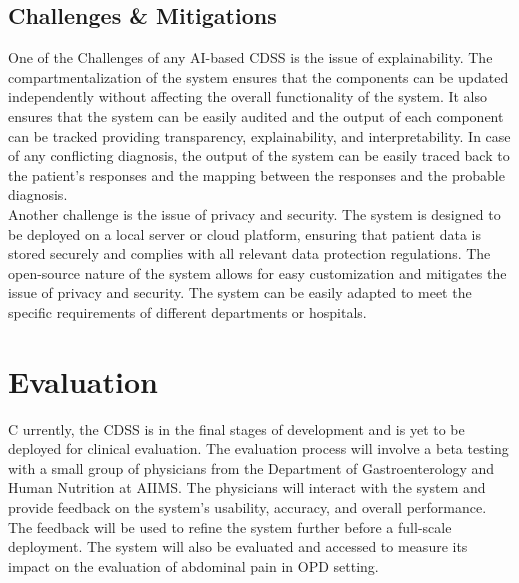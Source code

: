 \subsection{Challenges \& Mitigations}
One of the Challenges of any AI-based CDSS is the issue of explainability. The compartmentalization of the system ensures that the components can be updated independently without affecting the overall functionality of the system. It also ensures that the system can be easily audited and the output of each component can be tracked providing transparency, explainability, and interpretability. In case of any conflicting diagnosis, the output of the system can be easily traced back to the patient's responses and the mapping between the responses and the probable diagnosis.\\[\baselineskip]

\noindent Another challenge is the issue of privacy and security. The system is designed to be deployed on a local server or cloud platform, ensuring that patient data is stored securely and complies with all relevant data protection regulations. The open-source nature of the system allows for easy customization and mitigates the issue of privacy and security. The system can be easily adapted to meet the specific requirements of different departments or hospitals.\\[\baselineskip]

\section{Evaluation}
\lettrine{C}{ }urrently, the CDSS is in the final stages of development and is yet to be deployed for clinical evaluation. The evaluation process will involve a beta testing with a small group of physicians from the Department of Gastroenterology and Human Nutrition at AIIMS. The physicians will interact with the system and provide feedback on the system's usability, accuracy, and overall performance. The feedback will be used to refine the system further before a full-scale deployment. The system will also be evaluated and accessed to measure its impact on the evaluation of abdominal pain in OPD setting.\\[\baselineskip]